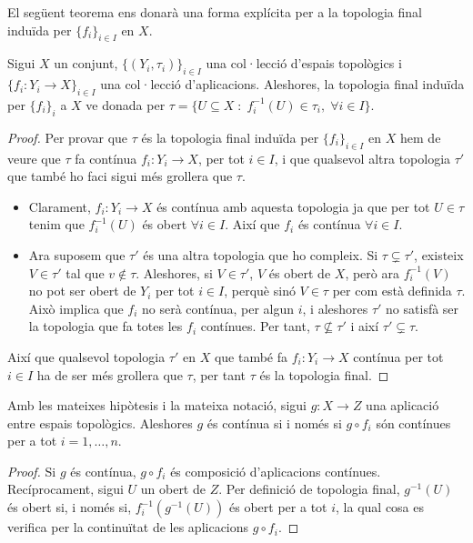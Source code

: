 \documentclass[../main.tex]{subfiles}
\begin{document}
El següent teorema ens donarà una forma explícita per a la topologia final induïda per $\{f_i\}_{i\in I}$ en $X$.

\begin{ter}
\label{ter:topologiafinal} Sigui $X$ un conjunt, $\{(Y_i,\tau_i)\}_{i\in I}$ una col·lecció d'espais topològics i $\{f_i:Y_i\rightarrow X\}_{i\in I}$ una col·lecció d'aplicacions. Aleshores, la topologia final induïda per $\{f_i\}_i$ a $X$ ve donada per $\tau = \{U\subseteq X\;:\;f_i^{-1}(U)\in\tau_i,\;\forall i\in I\}$.
\end{ter}
\begin{proof}
Per provar que $\tau$ és la topologia final induïda per $\{f_i\}_{i\in I}$ en $X$ hem de veure que $\tau$ fa contínua $f_i:Y_i\rightarrow X$, per tot $i\in I$, i que qualsevol altra topologia $\tau'$ que també ho faci sigui més grollera que $\tau$.
\begin{itemize}
    \item Clarament, $f_i:Y_i\rightarrow X$ és contínua amb aquesta topologia ja que per tot $U\in \tau$ tenim que $f_i^{-1}(U)$ és obert $\forall i \in I$. Així que $f_i$ és contínua $\forall i\in I$.
    \item Ara suposem que $\tau'$ és una altra topologia que ho compleix. Si $\tau\varsubsetneq \tau'$, existeix $V\in\tau'$ tal que $v\not\in\tau$. Aleshores, si $V\in\tau'$, $V$ és obert de $X$, però ara $f_i^{-1}(V)$ no pot ser obert de $Y_i$ per tot $i\in I$, perquè sinó $V\in\tau$ per com està definida $\tau$. Això implica que $f_i$ no serà contínua, per algun $i$, i aleshores $\tau'$ no satisfà ser la topologia que fa totes les $f_i$ contínues. Per tant, $\tau\not\subseteq\tau'$ i així $\tau'\varsubsetneq \tau$.
\end{itemize}
Així que qualsevol topologia $\tau'$ en $X$ que també fa $f_i:Y_i\rightarrow X$ contínua per tot $i\in I$ ha de ser més grollera que $\tau$, per tant $\tau$ és la topologia final.
\end{proof}

\begin{prop}
\label{prop:topologiafinal} Amb les mateixes hipòtesis i la mateixa notació, sigui $g:X\rightarrow Z$ una aplicació entre espais topològics. Aleshores $g$ és contínua si i només si $g\circ f_i$ són contínues per a tot $i=1,\ldots,n$.
\end{prop}
\begin{proof}
Si $g$ és contínua, $g\circ f_i$ és composició d'aplicacions contínues. Recíprocament, sigui $U$ un obert de $Z$. Per definició de topologia final, $g^{-1}(U)$ és obert si, i només si, $f_i^{-1}(g^{-1}(U))$ és obert per a tot $i$, la qual cosa es verifica per la continuïtat de les aplicacions $g\circ f_i$.
\end{proof}
\end{document}
